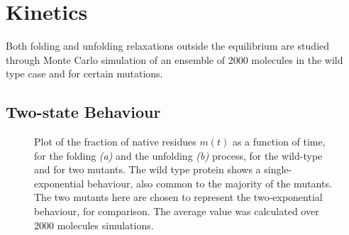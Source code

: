 \section{Kinetics}
\label{subsec:dynamics}

Both folding and unfolding relaxations outside the equilibrium are studied
through Monte Carlo simulation of an ensemble of 2000 molecules in the wild type
case and for certain mutations.

\subsection{Two-state Behaviour}

\begin{figure}[!htb]
\centering
{}
\caption{\label{fig:evo}
Plot of the fraction of native residues $m(t)$ as a function of time, 
for the folding \emph{(a)} and the unfolding \emph{(b)} process, for the wild-type  and for
two mutants. The wild type protein shows a single-exponential behaviour, also
common to the majority of the mutants. The two mutants here are chosen to
represent the two-exponential behaviour, for comparison.  The average value was
calculated over 2000 molecules simulations.
}
\end{figure}




